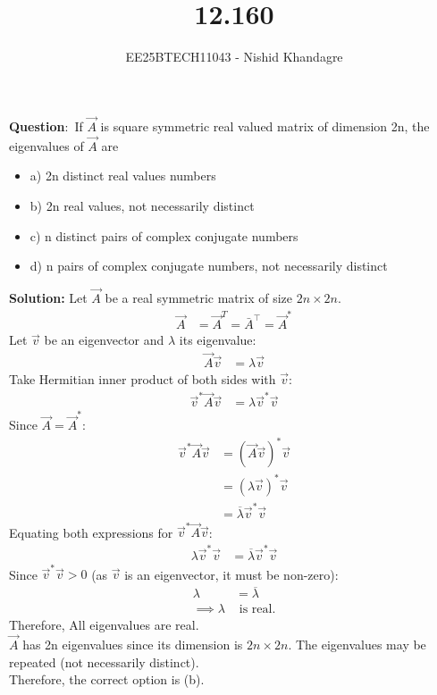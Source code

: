 \documentclass[journal]{IEEEtran}
\title{12.160}
\author{EE25BTECH11043 - Nishid Khandagre}
\begin{document}
\maketitle

\renewcommand{\thefigure}{\theenumi}
\renewcommand{\thetable}{\theenumi}



\textbf{Question}:\
If $\vec{A}$ is square symmetric real valued matrix of dimension 2n, the eigenvalues of $\vec{A}$ are
\begin{itemize}
    \item a) 2n distinct real values numbers
    \item b) 2n real values, not necessarily distinct
    \item c) n distinct pairs of complex conjugate numbers
    \item d) n pairs of complex conjugate numbers, not necessarily distinct
\end{itemize}

\textbf{Solution: }
Let $\vec{A}$ be a real symmetric matrix of size $2n \times 2n$.
\begin{align}
    \vec{A} &= \vec{A}^T =\bar{A}^{\top}= \vec{A}^*
\end{align}
Let $\vec{v}$ be an eigenvector and $\lambda$ its eigenvalue:
\begin{align}
    \vec{A} \vec{v} &= \lambda \vec{v}
\end{align}
Take Hermitian inner product of both sides with $\vec{v}$:
\begin{align}
    \vec{v}^* \vec{A} \vec{v} &= \lambda \vec{v}^* \vec{v}
\end{align}
Since $\vec{A} = \vec{A}^*$:
\begin{align}
    \vec{v}^* \vec{A} \vec{v} &= (\vec{A} \vec{v})^* \vec{v} \\
    &= (\lambda \vec{v})^* \vec{v} \\
    &= \overline{\lambda} \vec{v}^* \vec{v}
\end{align}
Equating both expressions for $\vec{v}^* \vec{A} \vec{v}$:
\begin{align}
    \lambda \vec{v}^* \vec{v} &= \overline{\lambda} \vec{v}^* \vec{v}
\end{align}
Since $\vec{v}^* \vec{v} > 0$ (as $\vec{v}$ is an eigenvector, it must be non-zero):
\begin{align}
    \lambda &= \overline{\lambda} \\
    \implies \lambda &\text{ is real.}
\end{align}
Therefore, All eigenvalues are real.\\
$\vec{A}$ has 2n eigenvalues since its dimension is $2n \times 2n$.
The eigenvalues may be repeated (not necessarily distinct).\\
Therefore, the correct option is (b).
\end{document}
